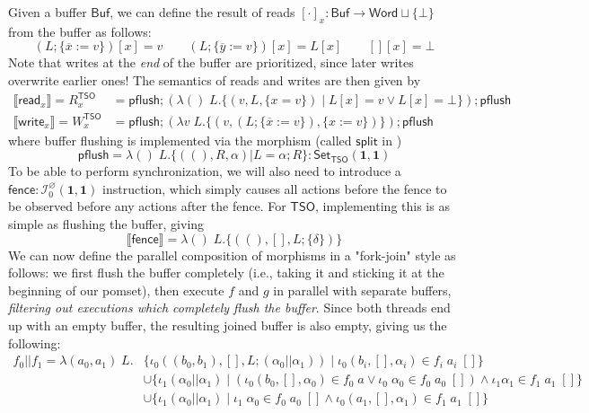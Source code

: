 \documentclass[acmsmall,screen,review]{acmart}
\newcommand{\mc}[1]{\ensuremath{\mathcal{#1}}}
\newcommand{\mb}[1]{\ensuremath{\mathbf{#1}}}
\newcommand{\ms}[1]{\ensuremath{\mathsf{#1}}}
\newcommand{\dnt}[1]{\llbracket{#1}\rrbracket}
\newcommand{\bufloc}[1]{\overline{#1}}
\begin{document}
Given a buffer \(\ms{Buf}\), we can define the result of reads \([\cdot]_x:
\ms{Buf} \to \ms{Word} \sqcup \{\bot\}\) from the buffer as follows:
\begin{equation}
  (L;\{\bufloc{x} := v\})[x] = v
  \qquad
  (L;\{\bufloc{y} := v\})[x] = L[x]
  \qquad
  [][x] = \bot
\end{equation}
Note that writes at the \textit{end} of the buffer are prioritized, since later
writes overwrite earlier ones! The semantics of reads and writes are then given
by
\begin{equation}
  \begin{aligned}
  \dnt{\ms{read}_x} = R_x^{\ms{TSO}} 
    &= \ms{pflush};(\lambda ()\;L. \{(v, L, \{x = v\}) \mid L[x] = v \lor L[x] = \bot\});\ms{pflush} \\
  \dnt{\ms{write}_x} = W_x^{\ms{TSO}}
    &= \ms{pflush};(\lambda v\;L. \{(v, (L;\{\bufloc{x} := v\}), \{x := v\})\});\ms{pflush}
  \end{aligned}
\end{equation}
where buffer flushing is implemented via the morphism (called \(\ms{split}\) in
\cite{sparky})
\begin{equation}
  \ms{pflush} = \lambda ()\;L. \{((), R, \alpha) | L = \alpha;R\}
  : \ms{Set}_{\ms{TSO}}(\mb{1}, \mb{1})
\end{equation}
To be able to perform synchronization, we will also need to introduce a \(\ms{fence}: \mc{I}^\varnothing_0(\mb{1}, \mb{1})\) instruction, which simply causes all actions before the fence to be observed before any actions after the fence. For \(\ms{TSO}\), implementing this is as simple as flushing the buffer, giving
\begin{equation}
  \dnt{\ms{fence}} = \lambda ()\;L. \{((), [], L;\{\delta\})\}
\end{equation}
We can now define the parallel composition of morphisms in a "fork-join" style
as follows: we first flush the buffer completely (i.e., taking it and sticking
it at the beginning of our pomset), then execute \(f\) and \(g\) in parallel
with separate buffers, \textit{filtering out executions which completely flush
the buffer}. Since both threads end up with an empty buffer, the resulting
joined buffer is also empty, giving us the following:
\begin{equation}
  \begin{aligned}
    f_0 || f_1 = \lambda (a_0, a_1)\;L. 
    & \{\iota_0 ((b_0, b_1), [], L;(\alpha_0 || \alpha_1)) 
      \mid \iota_0 (b_i, [], \alpha_i) \in f_i\;a_i\;[]\} 
    \\ & \cup \{\iota_1 (\alpha_0 || \alpha_1) \mid (\iota_0 (b_0, [], \alpha_0) \in f_0\;a \lor \iota_0\;\alpha_0 \in f_0\;a_0\;[]) \land \iota_1 \alpha_1 \in f_1\;a_1\;[]\} 
    \\ & \cup \{\iota_1 (\alpha_0 || \alpha_1) \mid \iota_1\;\alpha_0 \in f_0\;a_0\;[] \land \iota_0 (a_1, [], \alpha_1) \in f_1\;a_1\;[]\}
    \end{aligned}
\end{equation}
\end{document}

